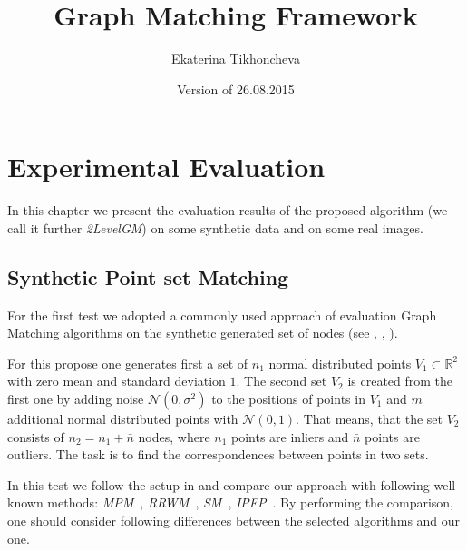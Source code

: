 \documentclass[
	fontsize=12pt,
	paper=a4,
	twoside=false,
	numbers=noenddot,
	plainheadsepline,
	toc=listof,
	toc=bibliography
]{scrartcl}
\def\datum{Version of 26.08.2015}
\begin{document}
\pagestyle{plain}

\title{Graph Matching Framework}
\author{Ekaterina Tikhoncheva}
\date{\datum} 

\maketitle 



\section{Experimental Evaluation}

In this chapter we present the evaluation results of the proposed algorithm (we call it further \emph{2LevelGM}) on some synthetic data and on some real images.

\subsection{Synthetic Point set Matching}

For the first test we adopted a commonly used approach of evaluation Graph Matching algorithms on the synthetic generated set of nodes (see \cite{Cho2014_Haystack}, \cite{Cho2010_RRWM}, \cite{Leordeanu2009_IPFP}). 

For this propose one generates first a set of $n_1$ normal distributed points $V_1\subset\mathbb{R}^2$ with zero mean and standard deviation $1$. The second set $V_2$ is created from the first one by adding noise $\mathcal{N}(0,\sigma^2)$ to the positions of points in $V_1$ and $m$ additional normal distributed points with $\mathcal{N}(0,1)$.  That means, that the set $V_2$ consists of $n_2=n_1+\bar{n}$ nodes, where $n_1$ points are inliers and $\bar{n}$ points are outliers. The task is to find the correspondences between points in two sets.

In this test we follow the setup in \cite{Cho2014_Haystack} and compare our approach with following well known 
methods: \emph{MPM}~\cite{Cho2014_Haystack}, \emph{RRWM}~\cite{Cho2010_RRWM}, \emph{SM}~\cite{Leordeanu2005}, \emph{IPFP}~\cite{Leordeanu2009_IPFP}. By performing the comparison, one should consider following differences between the selected algorithms and our one.
\end{document}
